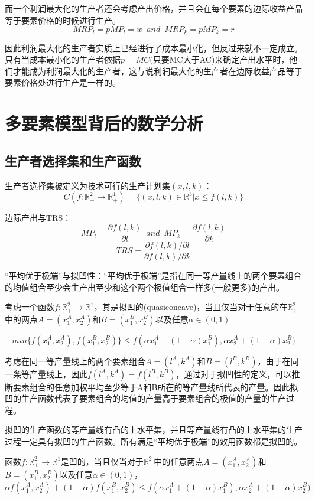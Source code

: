 \documentclass{article}
\begin{document}
而一个利润最大化的生产者还会考虑产出价格，并且会在每个要素的边际收益产品等于要素价格的时候进行生产。
\[
MRP_l=pMP_l=w\enspace and\enspace MRP_k=pMP_k=r
\]

因此利润最大化的生产者实质上已经进行了成本最小化，但反过来就不一定成立。只有当成本最小化的生产者依据$ p=MC $(只要MC大于AC)来确定产出水平时，他们才能成为利润最大化的生产者，这与说利润最大化的生产者在边际收益产品等于要素价格处进行生产是一样的。

\section{多要素模型背后的数学分析}
\subsection{生产者选择集和生产函数}
生产者选择集被定义为技术可行的生产计划集$ (x,l,k) $：
\[
C(f:\mathbb{R}^2_+\rightarrow\mathbb{R}^1_+)=\{(x,l,k)\in\mathbb{R}^3|x\le f(l,k)\}
\]

边际产出与TRS：
\[
MP_l=\frac{\partial f(l,k)}{\partial l}\enspace and\enspace MP_k=\frac{\partial f(l,k)}{\partial k}
\]
\[
TRS=\frac{\partial f(l,k)/\partial l}{\partial f(l,k)/\partial k}
\]

\hspace*{\fill}

“平均优于极端”与拟凹性：“平均优于极端”是指在同一等产量线上的两个要素组合的均值组合至少会生产出至少和这个两个极值组合一样多(一般更多)的产出。

考虑一个函数$ f:\mathbb{R}^2_+\rightarrow \mathbb{R}^1 $，其是拟凹的(quasiconcave)，当且仅当对于任意的在$ \mathbb{R}^2_+ $中的两点$ A=(x^A_1,x^A_2) $和$ B=(x^B_1,x^B_2) $以及任意$ \alpha\in(0,1) $

\[
min\{f(x^A_1,x^A_2),f(x^B_1,x^B_2)\}\le f(\alpha x^A_1+(1-\alpha)x^B_1),\alpha x^A_2+(1-\alpha)x^B_2)
\]

考虑在同一等产量线上的两个要素组合$ A=(l^A,k^A) $和$ B=(l^B,k^B) $，由于在同一条等产量线上，因此$ f(l^A,k^A)=f(l^B,k^B) $，通过对于拟凹性的定义，可以推断要素组合的任意加权平均至少等于A和B所在的等产量线所代表的产量。因此拟凹的生产函数代表了要素组合的均值的产量高于要素组合的极值的产量的生产过程。

拟凹的生产函数的等产量线有凸的上水平集，并且等产量线有凸的上水平集的生产过程一定具有拟凹的生产函数。所有满足“平均优于极端”的效用函数都是拟凹的。

\hspace*{\fill}

函数$ f:\mathbb{R}^2_+\rightarrow\mathbb{R}^1 $是凹的，当且仅当对于$ \mathbb{R}^2_+ $中的任意两点$ A=(x^A_1,x^A_2) $和$ B=(x^B_1,x^B_2) $以及任意$ \alpha\in(0,1) $，
\[
\alpha f(x^A_1,x^A_2)+(1-\alpha)f(x^B_1,x^B_2)\le f(\alpha x^A_1+(1-\alpha)x^B_1),\alpha x^A_2+(1-\alpha)x^B_2)
\]
\end{document}
